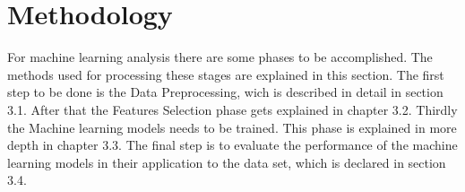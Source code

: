 \documentclass[../masterarbeit.tex]{subfiles}
\begin{document}
	


















\section{Methodology}

For machine learning analysis there are some phases to be accomplished. The methods used for processing these stages are explained in this section. The first step to be done is the Data Preprocessing, wich is described in detail in section 3.1. After that the Features Selection phase gets explained in chapter 3.2. Thirdly the Machine learning models needs to be trained. This phase is explained in more depth in chapter 3.3. The final step is to evaluate the performance of the machine learning models in their application to the data set, which is declared in section 3.4.





















\end{document}
